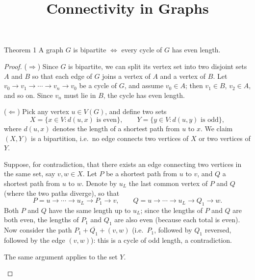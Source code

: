 \documentclass[11pt]{scrartcl}
\title{\color{accentblue}Connectivity in Graphs}
\author{}
\date{}
\theoremstyle{plain}
\theoremstyle{remark}
\begin{document}
\maketitle

\begin{thmbox}{Theorem 1}
A graph $G$ is bipartite $\iff$ every cycle of $G$ has even length.
\end{thmbox}

\begin{proof}
($\Rightarrow$) Since $G$ is bipartite, we can split its vertex set into two disjoint sets $A$ and $B$ so that each edge of $G$ joins a vertex of $A$ and a vertex of $B$. Let $v_0 \to v_1 \to \cdots \to v_n \to v_0$ be a cycle of $G$, and assume $v_0 \in A$; then $v_1 \in B$, $v_2 \in A$, and so on. Since $v_n$ must lie in $B$, the cycle has even length.

\medskip
\noindent ($\Leftarrow$) Pick any vertex $u \in V(G)$, and define two sets
$$X = \{x \in V : d(u,x) \text{ is even}\}, \qquad Y = \{y \in V : d(u,y) \text{ is odd}\},$$
where $d(u,x)$ denotes the length of a shortest path from $u$ to $x$. We claim $(X,Y)$ is a bipartition, i.e.\ no edge connects two vertices of $X$ or two vertices of $Y$.

Suppose, for contradiction, that there exists an edge connecting two vertices in the same set, say $v, w \in X$. Let $P$ be a shortest path from $u$ to $v$, and $Q$ a shortest path from $u$ to $w$. Denote by $u_L$ the last common vertex of $P$ and $Q$ (where the two paths diverge), so that
$$P = u \to \cdots \to u_L \to P_1 \to v, \qquad Q = u \to \cdots \to u_L \to Q_1 \to w.$$
Both $P$ and $Q$ have the same length up to $u_L$; since the lengths of $P$ and $Q$ are both even, the lengths of $P_1$ and $Q_1$ are also even (because each total is even). Now consider the path $P_1 + \overline{Q_1} + (v,w)$ (i.e.\ $P_1$, followed by $Q_1$ reversed, followed by the edge $(v,w)$): this is a cycle of odd length, a contradiction.

The same argument applies to the set $Y$.

\begin{center}
\end{center}
\end{proof}
\end{document}
